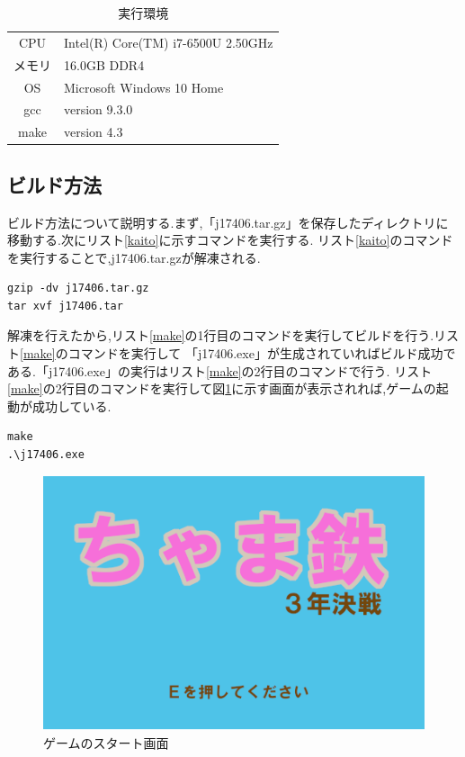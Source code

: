 \documentclass[a4j]{jarticle}
\begin{document}
      \begin{table}[H]
        \caption{実行環境}
      \label{env}
      \begin{center}
          \begin{tabular}{c|l}\hline
            CPU & Intel(R) Core(TM) i7-6500U 2.50GHz  \\ 
            メモリ & 16.0GB DDR4 \\
            OS & Microsoft Windows 10 Home \\
            gcc &  version 9.3.0 \\
            make & version 4.3 \\ \hline
          \end{tabular}
      \end{center}
      \end{table}
      
      \subsection{ビルド方法}
      ビルド方法について説明する.まず,「j17406.tar.gz」を保存したディレクトリに移動する.次にリスト\ref{kaito}に示すコマンドを実行する.
      リスト\ref{kaito}のコマンドを実行することで,j17406.tar.gzが解凍される.
      \begin{lstlisting}[basicstyle=\ttfamily\footnotesize, frame=single,label=kaito,caption=j17406.tar.gzの解凍]
gzip -dv j17406.tar.gz
tar xvf j17406.tar
        \end{lstlisting}
        解凍を行えたから,リスト\ref{make}の1行目のコマンドを実行してビルドを行う.リスト\ref{make}のコマンドを実行して
        「j17406.exe」が生成されていればビルド成功である.「j17406.exe」の実行はリスト\ref{make}の2行目のコマンドで行う.
        リスト\ref{make}の2行目のコマンドを実行して図\ref{sp4}に示す画面が表示されれば,ゲームの起動が成功している.
        \begin{lstlisting}[basicstyle=\ttfamily\footnotesize, frame=single,label=make,caption=makeコマンド]
make
.\j17406.exe
        \end{lstlisting}  

    \begin{figure}[H]
        \centering
        \includegraphics[scale=1.8]{sp4.png}
        \caption{ゲームのスタート画面}
         \label{sp4}
        \end{figure}
\end{document}
